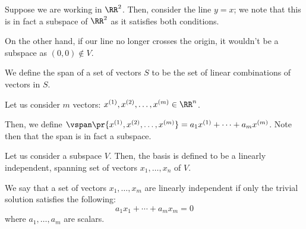 \documentclass[openany]{book}
\begin{document}
\begin{example}[Examples in $\RR^{2}$]
	Suppose we are working in $\RR^{2}$. Then, consider the line $y = x$; we note that this is in fact a subspace of $\RR^{2}$ as it satisfies both conditions.
	
	On the other hand, if our line no longer crosses the origin, it wouldn't be a subspace as $(0,0) \not\in V$.
\end{example}

\begin{defn}[Span]
	We define the span of a set of vectors $S$ to be the set of linear combinations of vectors in $S$.
\end{defn}
\begin{example}
	Let us consider $m$ vectors: $x^{(1)}, x^{(2)}, \ldots, x^{(m)} \in \RR^{n}$.
	
	Then, we define $\vspan \pr{x^{(1)}, x^{(2)}, \ldots, x^{(m)}} = a_1x^{(1)} + \cdots + a_mx^{(m)}$. Note then that the span is in fact a subspace.
\end{example}

\begin{defn}[Basis]
	Let us consider a subspace $V$. Then, the basis is defined to be a linearly independent, spanning set of vectors $x_1, \ldots, x_n$ of $V$.
\end{defn}

\begin{defn}
	We say that a set of vectors $x_1, \ldots, x_m$ are linearly independent if only the trivial solution satisfies the following:
	\begin{equation*}
		a_1x_1 + \cdots + a_mx_m = 0
	\end{equation*}
	where $a_1, \ldots, a_m$ are scalars.
\end{defn}
\end{document}
